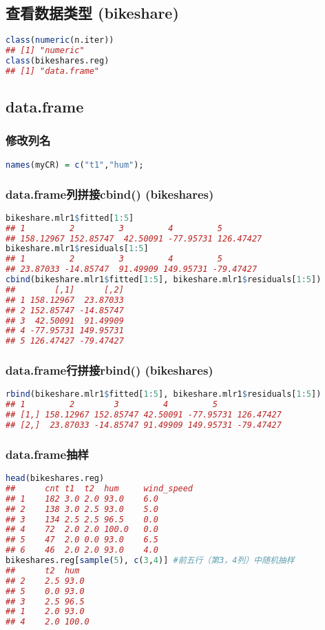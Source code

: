 \documentclass[11pt,a4paper]{article}
\begin{document}
\subsection{查看数据类型 (bikeshare)}
\begin{lstlisting}[language=R]
class(numeric(n.iter))
## [1] "numeric"
class(bikeshares.reg)
## [1] "data.frame"
\end{lstlisting}


\subsection{data.frame}
\subsubsection{修改列名}
\begin{lstlisting}[language=R]
names(myCR) = c("t1","hum");
\end{lstlisting}
\subsubsection{data.frame列拼接cbind() (bikeshares)}
\begin{lstlisting}[language=R]
bikeshare.mlr1$fitted[1:5]
## 1         2         3         4         5 
## 158.12967 152.85747  42.50091 -77.95731 126.47427 
bikeshare.mlr1$residuals[1:5]
## 1         2         3         4         5 
## 23.87033 -14.85747  91.49909 149.95731 -79.47427 
cbind(bikeshare.mlr1$fitted[1:5], bikeshare.mlr1$residuals[1:5])
##        [,1]      [,2]
## 1 158.12967  23.87033
## 2 152.85747 -14.85747
## 3  42.50091  91.49909
## 4 -77.95731 149.95731
## 5 126.47427 -79.47427
\end{lstlisting}
\subsubsection{data.frame行拼接rbind() (bikeshares)}
\begin{lstlisting}[language=R]
rbind(bikeshare.mlr1$fitted[1:5], bikeshare.mlr1$residuals[1:5])
## 1         2        3         4         5
## [1,] 158.12967 152.85747 42.50091 -77.95731 126.47427
## [2,]  23.87033 -14.85747 91.49909 149.95731 -79.47427
\end{lstlisting}
\subsubsection{data.frame抽样}
\begin{lstlisting}[language=R]
head(bikeshares.reg)
##      cnt t1  t2  hum     wind_speed
## 1	182	3.0	2.0	93.0	6.0
## 2	138	3.0	2.5	93.0	5.0
## 3	134	2.5	2.5	96.5	0.0
## 4	72	2.0	2.0	100.0	0.0
## 5	47	2.0	0.0	93.0	6.5
## 6	46	2.0	2.0	93.0	4.0
bikeshares.reg[sample(5), c(3,4)] #前五行（第3，4列）中随机抽样
##      t2  hum
## 2	2.5	93.0
## 5	0.0	93.0
## 3	2.5	96.5
## 1	2.0	93.0
## 4	2.0	100.0
\end{lstlisting}
\end{document}
